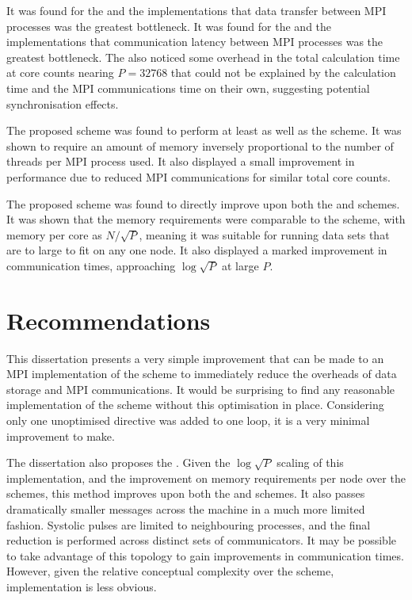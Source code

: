 It was found for the \replicateddata{} and the \sharedandreplicateddata{}
implementations that
data transfer between MPI processes was the greatest bottleneck.
%
It was found for the \systolicloop{} and the \replicatedsystolicloop{}
implementations that
communication latency between MPI processes was the greatest bottleneck.
%
The \replicatedsystolicloop{} also noticed some overhead in the total
calculation time at core counts
nearing $P = 32768$ that could not be explained by the calculation time
and the MPI communications time on their own, suggesting potential
synchronisation effects.

The proposed \sharedandreplicateddata{} scheme was found to perform at
least as well as the \replicateddata{} scheme.
%
It was  shown to require
an amount of memory inversely proportional to the number of
\openmp{} threads per MPI process used.
%
It also displayed a small improvement in performance due to
reduced MPI communications for similar total core counts.

The proposed \replicatedsystolicloop{} scheme was found to directly
improve upon both the \replicateddata{} and \systolicloop{} schemes.
%
It was shown that the memory requirements were comparable to
the \systolicloop{} scheme, with memory per core as $N/\sqrt{P}$,
meaning it was suitable for running data sets that are to large to
fit on any one node.
%
It also displayed a marked improvement in communication times,
approaching $\log{\sqrt{P}}$ at large $P$.


\section{Recommendations}

This dissertation presents a very simple improvement that can be
made to an MPI implementation of the \replicateddata{} scheme to 
immediately reduce the overheads of data storage and MPI
communications.
%
It would be surprising to find any reasonable implementation of the
\replicateddata{} scheme without this optimisation in place.
%
Considering only one unoptimised \openmp{} directive was added to
one loop, it is a very minimal improvement to make.

The dissertation also proposes the \replicatedsystolicloop{}.
%
Given the $\log{\sqrt{P}}$ scaling of this implementation, and the
improvement on memory requirements per node over the \replicateddata{}
schemes, this method improves upon both the \replicateddata{} and
\systolicloop{} schemes.
%
It also passes dramatically smaller messages across the machine
in a much more limited fashion.
%
Systolic pulses are limited to neighbouring processes, and the final
reduction is performed across distinct sets of communicators.
%
It may be possible to take advantage of this topology to gain
improvements in communication times.
%
However, given the relative conceptual complexity over the \replicateddata{}
scheme, implementation is less obvious.

